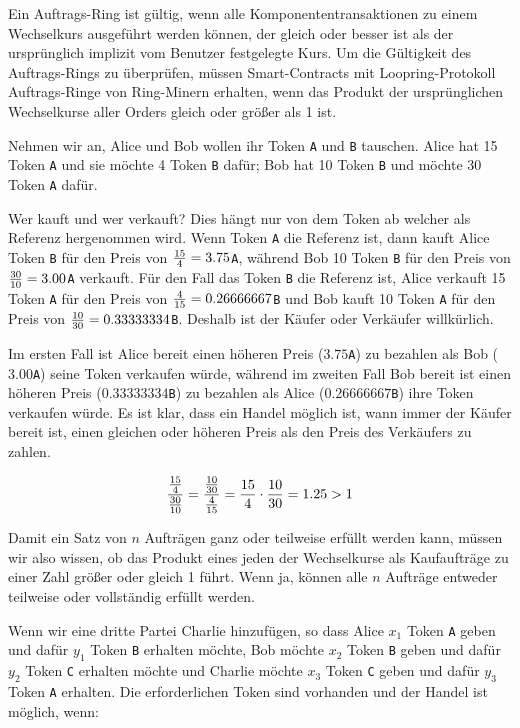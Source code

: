 \documentclass[UTF8,nofonts]{article}
\begin{document}
\begin{multicols}{2}
Ein Auftrags-Ring ist gültig, wenn alle Komponententransaktionen zu einem Wechselkurs ausgeführt werden können, der gleich oder besser ist als der ursprünglich implizit vom Benutzer festgelegte Kurs. Um die Gültigkeit des Auftrags-Rings zu überprüfen, müssen Smart-Contracts mit Loopring-Protokoll Auftrags-Ringe von Ring-Minern erhalten, wenn das Produkt der ursprünglichen Wechselkurse aller Orders gleich oder größer als 1 ist.

Nehmen wir an, Alice und Bob wollen ihr Token \verb|A| und \verb|B| tauschen. Alice hat 15 Token \verb|A| und sie möchte 4 Token \verb|B| dafür; Bob hat 10 Token \verb|B| und möchte 30 Token \verb|A| dafür.

Wer kauft und wer verkauft? Dies hängt nur von dem Token ab welcher als Referenz hergenommen wird. Wenn Token \verb|A| die Referenz ist, dann kauft Alice Token \verb|B| für den Preis von ${15 \over 4} = 3.75$\verb|A|, während Bob 10 Token \verb|B| für den Preis von ${30 \over 10} = 3.00$\verb|A| verkauft. Für den Fall das Token \verb|B| die Referenz ist, Alice verkauft 15 Token \verb|A| für den Preis von ${4\over 15}=0.26666667$\verb|B| und Bob kauft 10 Token \verb|A| für den Preis von ${10 \over 30}=0.33333334$\verb|B|. Deshalb ist der Käufer oder Verkäufer willkürlich.

Im ersten Fall ist Alice bereit einen höheren Preis ($3.75$\verb|A|) zu bezahlen als Bob ($3.00$\verb|A|) seine Token verkaufen würde, während im zweiten Fall Bob bereit ist einen höheren Preis ($0.33333334$\verb|B|) zu bezahlen als Alice ($0.26666667$\verb|B|) ihre Token verkaufen würde. Es ist klar, dass ein Handel möglich ist, wann immer der Käufer bereit ist, einen gleichen oder höheren Preis als den Preis des Verkäufers zu zahlen.

\begin{equation}
{{15\over 4} \over {30\over 10}} = {{10\over 30} \over {4\over 15}}={15 \over 4} \cdot {10 \over 30} = 1.25 > 1
\end{equation}

Damit ein Satz von $n$  Aufträgen ganz oder teilweise erfüllt werden kann, müssen wir also wissen, ob das Produkt eines jeden der Wechselkurse als Kaufaufträge zu einer Zahl größer oder gleich 1 führt. Wenn ja, können alle $n$  Aufträge entweder teilweise oder vollständig erfüllt werden. 

Wenn wir eine dritte Partei Charlie hinzufügen, so dass Alice $x_1$ Token \verb|A| geben und dafür $y_1$ Token \verb|B| erhalten möchte, Bob möchte $x_2$ Token \verb|B| geben und dafür $y_2$ Token \verb|C| erhalten möchte und Charlie möchte $x_3$ Token \verb|C| geben und dafür $y_3$ Token \verb|A| erhalten. Die erforderlichen Token sind vorhanden und der Handel ist möglich, wenn:


\end{multicols}
\end{document}
